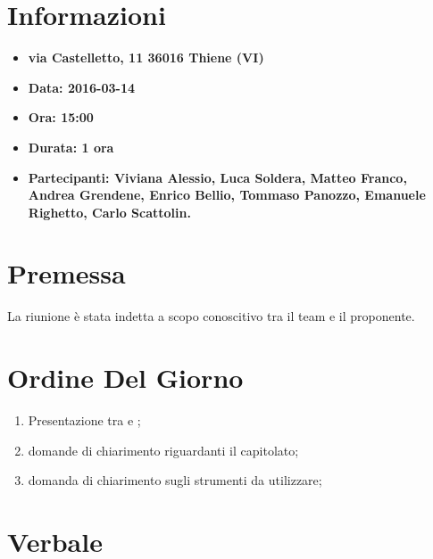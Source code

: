 \documentclass[a4paper,titlepage]{article}
\begin{document}
\maketitle

\newpage
\tableofcontents

\newpage
\section{Informazioni}
\label{sec:Informazioni}

\begin{itemize}
  \item \textbf{via Castelletto, 11
  	36016 Thiene (VI)}
  \item \textbf{Data: 2016-03-14}
  \item \textbf{Ora: 15:00}
  \item \textbf{Durata: 1 ora}
  \item \textbf{Partecipanti: Viviana Alessio, Luca Soldera, Matteo Franco, Andrea Grendene, Enrico Bellio, Tommaso Panozzo, Emanuele Righetto, Carlo Scattolin.}
\end{itemize}

\newpage
\section{Premessa}

La riunione è stata indetta a scopo conoscitivo tra il team e il proponente.

\section{Ordine Del Giorno}
\label{sec:OrdineDelGiorno}

\begin{enumerate}
  \item Presentazione tra \AUTORE{} e \PROPONENTE;
  \item domande di chiarimento riguardanti il capitolato;
  \item domanda di chiarimento sugli strumenti da utilizzare;
\end{enumerate}

\newpage
\section{Verbale}
\label{sec:Verbale}
\end{document}
